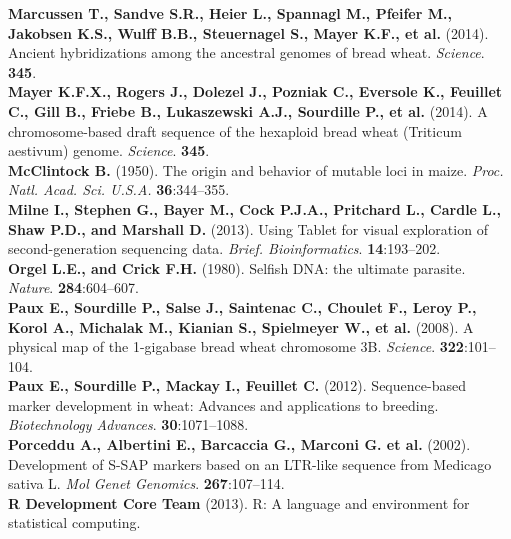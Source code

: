 \documentclass[a4paper, 12pt]{article}
\begin{document}
\begin{onehalfspace}
\begin{flushleft}
\vspace{0.3cm}
\textbf{Marcussen T., Sandve S.R., Heier L., Spannagl M., Pfeifer M., Jakobsen K.S., Wulff B.B., Steuernagel S., Mayer K.F., et al.} (2014). Ancient hybridizations among the ancestral genomes of bread wheat. \textit{Science}. \textbf{345}.\\
\vspace{0.3cm}
\textbf{Mayer K.F.X., Rogers J., Dolezel J., Pozniak C., Eversole K., Feuillet C., Gill B., Friebe B., Lukaszewski A.J., Sourdille P., et al.} (2014). A chromosome-based draft sequence of the hexaploid bread wheat (Triticum aestivum) genome. \textit{Science}. \textbf{345}.\\
\vspace{0.3cm}
\textbf{McClintock B.} (1950). The origin and behavior of mutable loci in maize. \textit{Proc. Natl. Acad. Sci. U.S.A.} \textbf{36}:344–355.\\
\vspace{0.3cm}
\textbf{Milne I., Stephen G., Bayer M., Cock P.J.A., Pritchard L., Cardle L., Shaw P.D., and Marshall D.} (2013). Using Tablet for visual exploration of second-generation sequencing data. \textit{Brief. Bioinformatics}. \textbf{14}:193–202.\\
\vspace{0.3cm}
\textbf{Orgel L.E., and Crick F.H.} (1980). Selfish DNA: the ultimate parasite. \textit{Nature}. \textbf{284}:604–607.\\
\vspace{0.3cm}
\textbf{Paux E., Sourdille P., Salse J., Saintenac C., Choulet F., Leroy P., Korol A., Michalak M., Kianian S., Spielmeyer W., et al.} (2008). A physical map of the 1-gigabase bread wheat chromosome 3B. \textit{Science}. \textbf{322}:101–104.\\
\vspace{0.3cm}
\textbf{Paux E., Sourdille P., Mackay I., Feuillet C.} (2012). Sequence-based marker development in wheat: Advances and applications to breeding. \textit{Biotechnology Advances}. \textbf{30}:1071–1088.\\
\vspace{0.3cm}
\textbf{Porceddu A., Albertini E., Barcaccia G., Marconi G. et al.} (2002). Development of S-SAP markers based on an LTR-like sequence from Medicago sativa L. \textit{Mol Genet Genomics}. \textbf{267}:107–114.\\
\vspace{0.3cm}
\textbf{R Development Core Team} (2013). R: A language and environment for statistical computing.\\

\end{flushleft}
\end{onehalfspace}
\end{document}

